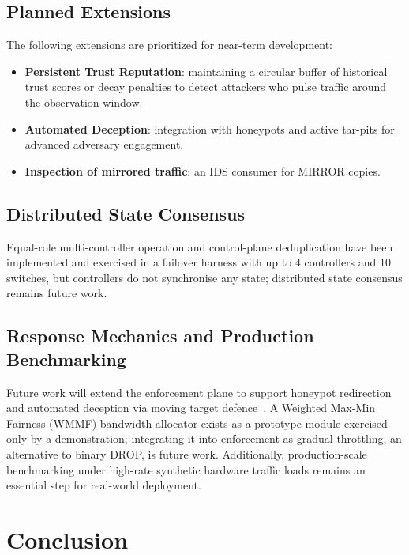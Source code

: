 \documentclass[conference]{IEEEtran}
\begin{document}
\subsection{Planned Extensions}
The following extensions are prioritized for near-term development:
\begin{itemize}
\item \textbf{Persistent Trust Reputation}: maintaining a circular buffer of historical trust scores or decay penalties to detect attackers who pulse traffic around the observation window.
\item \textbf{Automated Deception}: integration with honeypots and active tar-pits for advanced adversary engagement.
\item \textbf{Inspection of mirrored traffic}: an IDS consumer for MIRROR copies.
\end{itemize}

\subsection{Distributed State Consensus}
Equal-role multi-controller operation and control-plane deduplication have been implemented and exercised in a failover harness with up to 4 controllers and 10 switches, but controllers do not synchronise any state; distributed state consensus remains future work.

\subsection{Response Mechanics and Production Benchmarking}
Future work will extend the enforcement plane to support honeypot redirection~\cite{provos2004virtual} and automated deception via moving target defence~\cite{jajodia2011mtd}. A Weighted Max-Min Fairness (WMMF) bandwidth allocator exists as a prototype module exercised only by a demonstration; integrating it into enforcement as gradual throttling, an alternative to binary DROP, is future work. Additionally, production-scale benchmarking under high-rate synthetic hardware traffic loads remains an essential step for real-world deployment.


\section{Conclusion}
\end{document}
